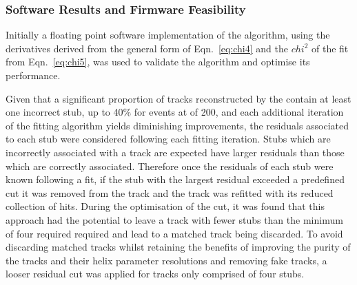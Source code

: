\subsubsection{Software Results and Firmware Feasibility}\label{subsubsec:chi2software}
Initially a floating point software implementation of the algorithm, using the derivatives derived from the general form of Eqn.~\ref{eq:chi4} and the $chi^{2}$ of the fit from  Eqn.~\ref{eq:chi5}, was used to validate the algorithm and optimise its performance.

Given that a significant proportion of tracks reconstructed by the \HT contain at least one incorrect stub, up to 40\% for \ttbar events at \PU of 200, and each additional iteration of the fitting algorithm yields diminishing improvements, the residuals associated to each stub were considered following each fitting iteration.
Stubs which are incorrectly associated with a track are expected have larger residuals than those which are correctly associated.
Therefore once the residuals of each stub were known following a fit, if the stub with the largest residual exceeded a predefined cut it was removed from the track and the track was refitted with its reduced collection of hits. 
During the optimisation of the cut, it was found that this approach had the potential to leave a track with fewer stubs than the minimum of four required required and lead to a matched track being discarded.
To avoid discarding matched tracks whilst retaining the benefits of improving the purity of the tracks and their helix parameter resolutions and removing fake tracks, a looser residual cut was applied for tracks only comprised of four stubs.

